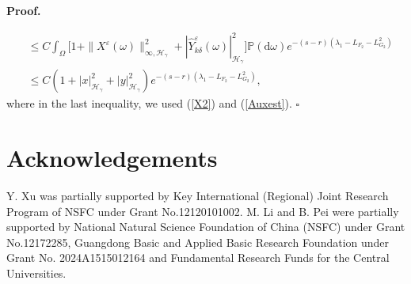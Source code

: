 \documentclass[10pt,a4paper]{article}
\numberwithin{equation}{section}
\newenvironment{proof}[1][\normalfont\bfseries Proof]{%
	\noindent #1.\hspace{0.5em}%
	\ignorespaces%
}{%
	\hfill $\square$%
	\par%
}
\begin{document}
\begin{proof}
\begin{align*}
	&\leq C\int_\Omega\Big[1+\|X^\varepsilon(\omega)\|_{\infty,\mathcal H_\gamma}^2+|\hat{Y}^\varepsilon_{k\delta}(\omega)|_{\mathcal H_\gamma }^2\Big]\mathbb P(\mathrm{d} \omega) e^{-(s-r)(\lambda_1-L_{F_2}-L_{G_2}^2)}   \nonumber\\
	&\leq C(1+|x|_{\mathcal H_\gamma}^2+| y |_{\mathcal H_\gamma }^2) e^{-(s-r)(\lambda_1-L_{F_2}-L_{G_2}^2)},
\end{align*}
where in the last inequality, we used (\ref{X2}) and (\ref{Auxest}).
\end{proof}








\section*{Acknowledgements}
Y. Xu was partially supported by Key International (Regional) Joint Research Program of NSFC under Grant No.12120101002.
M. Li and B. Pei were partially supported by National Natural Science Foundation of China (NSFC) under Grant No.12172285, Guangdong Basic and Applied Basic Research Foundation under Grant No. 2024A1515012164 and Fundamental
Research Funds for the Central Universities.
\end{document}
